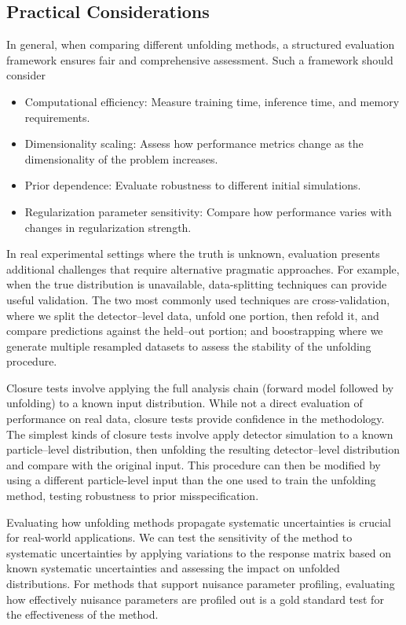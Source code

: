 \subsection{Practical Considerations}
In general, when comparing different unfolding methods, a structured evaluation framework ensures fair and comprehensive assessment. Such a framework should consider
\begin{itemize}
    \item Computational efficiency: Measure training time, inference time, and memory requirements.
    \item Dimensionality scaling: Assess how performance metrics change as the dimensionality of the problem increases.
    \item Prior dependence: Evaluate robustness to different initial simulations.
    \item Regularization parameter sensitivity: Compare how performance varies with changes in regularization strength.
\end{itemize}

In real experimental settings where the truth is unknown, evaluation presents additional challenges that require alternative pragmatic approaches.
%
For example, when the true distribution is unavailable, data-splitting techniques can provide useful validation.
%
The two most commonly used techniques are cross-validation, where we split the detector--level data, unfold one portion, then refold it, and compare predictions against the held--out portion; and boostrapping where we generate multiple resampled datasets to assess the stability of the unfolding procedure.

Closure tests involve applying the full analysis chain (forward model followed by unfolding) to a known input distribution.
%
While not a direct evaluation of performance on real data, closure tests provide confidence in the methodology.
%
The simplest kinds of closure tests involve apply detector simulation to a known particle--level distribution, then unfolding the resulting detector--level distribution and compare with the original input.
%
This procedure can then be modified by using a different particle-level input than the one used to train the unfolding method, testing robustness to prior misspecification.

Evaluating how unfolding methods propagate systematic uncertainties is crucial for real-world applications.
%
We can test the sensitivity of the method to systematic uncertainties by applying variations to the response matrix based on known systematic uncertainties and assessing the impact on unfolded distributions.
%
For methods that support nuisance parameter profiling, evaluating how effectively nuisance parameters are profiled out is a gold standard test for the effectiveness of the method.

